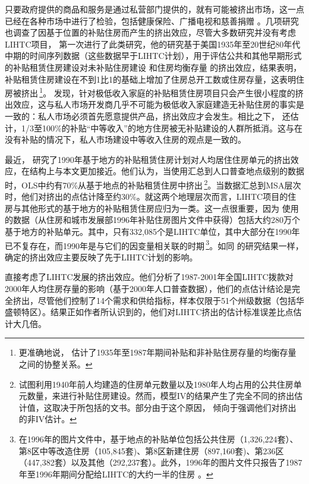 \documentclass[lang=cn,11pt,a4paper]{paper}
\begin{document}
只要政府提供的商品和服务是通过私营部门提供的，就有可能被挤出市场，这一点已经在各种市场中进行了检验，包括健康保险、广播电视和慈善捐赠 \citep{Cutler1996391,Berry1999189,Andreoni2003792}。几项研究也调查了因基于位置的补贴住房而产生的挤出效应，尽管大多数研究并没有考虑LIHTC项目，\cite{Murray1983590,Murray1999107} 第一次进行了此类研究，他的研究基于美国1935年至20世纪80年代中期的时间序列数据（这些数据早于LIHTC计划），用于评估公共和其他早期形式的补贴租赁住房建设对未补贴住房建设 \citep{Murray1983590} 和住房均衡存量 \citep{Murray1999107} 的挤出效应，结果表明，补贴租赁住房建设在不到1比1的基础上增加了住房总开工数或住房存量，这表明住房被挤出\,\footnote{更准确地说，\cite{Murray1999107} 估计了1935年至1987年期间补贴和非补贴住房存量的均衡存量之间的协整关系。}。\cite{Murray1999107} 发现，针对极低收入家庭的补贴租赁住房项目只会产生很小程度的挤出效应，这与私人市场开发商几乎不可能为极低收入家庭建造无补贴住房的事实是一致的：私人市场必须首先愿意提供产品，挤出效应才会发生。相比之下，\cite{Murray1999107} 还估计，1/3至100\%的补贴“中等收入”的地方住房被无补贴建设的人群所抵消。这与在没有补贴的情况下，私人市场建设中等收入住房的观点是一致的。

最近，\cite{Sinai20052137} 研究了1990年基于地方的补贴租赁住房计划对人均居住住房单元的挤出效应，在结构上与本文更加接近。他们认为，当使用汇总到人口普查地点级别的数据时，OLS中约有70\%从基于地点的补贴租赁住房中挤出\,\footnote{\cite{Sinai20052137} 试图利用1940年前人均建造的住房单元数量以及1980年人均占用的公共住房单元数量，来进行补贴住房建设。然而，模型IV的结果产生了完全不同的挤出估计值，这取决于所包括的文书。部分由于这个原因，\cite{Sinai20052137} 倾向于强调他们对挤出的非IV估计。}。当数据汇总到MSA层次时，他们对挤出的点估计降至约30\%。就这两个地理层次而言，LIHTC项目的住房与其他形式的基于地方的补贴租赁住房应归为一类。这一点很重要，因为 \cite{Sinai20052137} 使用的数据（从住房和城市发展部1996年补贴住房图片文件中获得）包括大约280万个基于地方的补贴单元。其中，只有332,085个是LIHTC单位，其中大部分在1990年已不复存在，而1990年是与它们的因变量相关联的时期\,\footnote{在1996年的图片文件中，基于地点的补贴单位包括公共住房（1,326,224套）、第8区中等改造住房（105,845套)、第8区新建住房（897,160套)、第236区（447,382套）以及其他（292,237套）。此外，1996年的图片文件只报告了1987年至1996年期间分配给LIHTC的大约一半的住房 \citep{Malpezzi2002360}。}。如同 \cite{Murray1983590,Murray1999107} 的研究结果一样，\cite{Sinai20052137} 确定的挤出效应主要反映了先于LIHTC计划的影响。

\cite{Malpezzi2002360} 直接考虑了LIHTC发展的挤出效应。他们分析了1987-2001年全国LIHTC拨款对2000年人均住房存量的影响（基于2000年人口普查数据），他们的点估计结论是完全挤出，尽管他们控制了14个需求和供给指标，样本仅限于51个州级数据（包括华盛顿特区）。结果正如作者所认识到的，他们对LIHTC挤出的估计标准误差比点估计大几倍。
\end{document}
